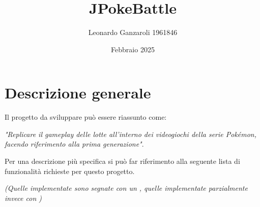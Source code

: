 \documentclass{article}
\title{JPokeBattle}
\author{Leonardo Ganzaroli 1961846}
\date{Febbraio 2025}
\begin{document}
\maketitle

\tableofcontents
\listoffigures

\hypersetup{allcolors=black}

\newpage

\section{Descrizione generale}

\fontsize{12pt}{14pt}\selectfont

Il progetto da sviluppare può essere riassunto come: \vspace{5pt}

\raggedright
\textit{"Replicare il gameplay delle lotte all’interno dei videogiochi della serie
Pokémon, facendo riferimento alla prima generazione"}. \newline

Per una descrizione più specifica si può far riferimento alla seguente lista di funzionalità richieste per questo progetto.  \newline

\textit{(Quelle implementate sono segnate con un  {\color{green}\checkmark}, quelle implementate parzialmente invece con  {\color{yellow}\checkmark}) \newline}
\end{document}
